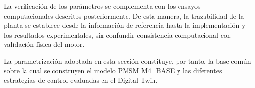 La verificación de los parámetros se complementa con los ensayos computacionales descritos posteriormente. De esta manera, la trazabilidad de la planta se establece desde la información de referencia hasta la implementación y los resultados experimentales, sin confundir consistencia computacional con validación física del motor.

La parametrización adoptada en esta sección constituye, por tanto, la base común sobre la cual se construyen el modelo PMSM M4\_BASE y las diferentes estrategias de control evaluadas en el Digital Twin.

